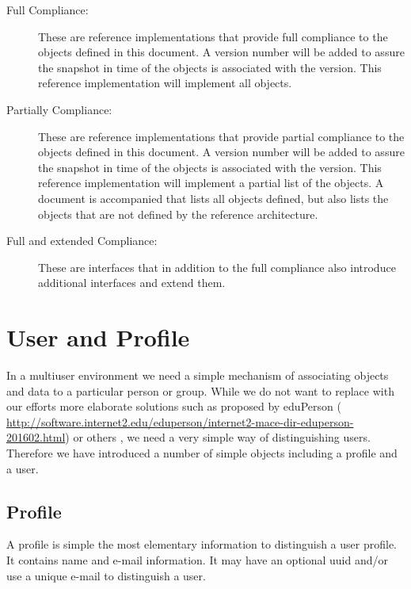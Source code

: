 \documentclass[9pt,twocolumn,twoside]{styles/osajnl}
\begin{document}
\begin{description}

\item[Full Compliance:] These are reference implementations that
  provide full compliance to the objects defined in this document. A
  version number will be added to assure the snapshot in time of the
  objects is associated with the version. This reference
  implementation will implement all objects.

\item[Partially Compliance:] These are reference implementations that
  provide partial compliance to the objects defined in this
  document. A version number will be added to assure the snapshot in
  time of the objects is associated with the version. This reference
  implementation will implement a partial list of the objects. A
  document is accompanied that lists all objects defined, but also
  lists the objects that are not defined by the reference
  architecture.

\item[Full and extended Compliance:] These are interfaces that in
  addition to the full compliance also introduce additional interfaces
  and extend them.

\end{description}

\section{User and Profile}

In a multiuser environment we need a simple mechanism of associating
objects and data to a particular person or group. While we do not want
to replace with our efforts more elaborate solutions such as proposed
by eduPerson (\url{
http://software.internet2.edu/eduperson/internet2-mace-dir-eduperson-201602.html})
or others \cite{??}, we need a very simple way of distinguishing
users. Therefore we have introduced a number of simple objects
including a profile and a user.

\subsection{Profile}

A profile is simple the most elementary information to distinguish a
user profile. It contains name and e-mail information. It may have an
optional uuid and/or use a unique e-mail to distinguish a
user. 
\end{document}
